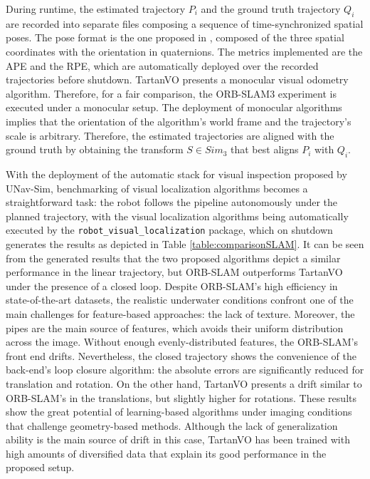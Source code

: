 During runtime, the estimated trajectory $P_i$ and the ground truth trajectory $Q_i$ are recorded into separate files composing a sequence of time-synchronized spatial poses. The pose format is the one proposed in \cite{vSLAM:sturm2012tumrgbd}, composed of the three spatial coordinates with the orientation in quaternions.
The metrics implemented are the \ac{APE} and the \ac{RPE}, which are automatically deployed over the recorded trajectories before shutdown. TartanVO presents a monocular visual odometry algorithm. Therefore, for a fair comparison, the ORB-SLAM3 experiment is executed under a monocular setup. 
The deployment of monocular algorithms implies that the orientation of the algorithm's world frame and the trajectory's scale is arbitrary. Therefore, the estimated trajectories are aligned with the ground truth by obtaining the transform $S \in Sim_3$ that best aligns $P_i$ with $Q_i$.

With the deployment of the automatic stack for visual inspection proposed by UNav-Sim, benchmarking of visual localization algorithms becomes a straightforward task: the robot follows the pipeline autonomously under the planned trajectory, with the visual localization algorithms being automatically executed by the \texttt{robot\_visual\_localization} package, which on shutdown generates the results as depicted in Table \ref{table:comparisonSLAM}. It can be seen from the generated results that the two proposed algorithms depict a similar performance in the linear trajectory, but ORB-SLAM outperforms TartanVO under the presence of a closed loop.
Despite ORB-SLAM's high efficiency in state-of-the-art datasets, the realistic underwater conditions confront one of the main challenges for feature-based approaches: the lack of texture. Moreover, the pipes are the main source of features, which avoids their uniform distribution across the image. Without enough evenly-distributed features, the ORB-SLAM's front end drifts. Nevertheless, the closed trajectory shows the convenience of the back-end's loop closure algorithm: the absolute errors are significantly reduced for translation and rotation.
On the other hand, TartanVO presents a drift similar to ORB-SLAM's in the translations, but slightly higher for rotations. These results show the great potential of learning-based algorithms under imaging conditions that challenge geometry-based methods. Although the lack of generalization ability is the main source of drift in this case, TartanVO has been trained with high amounts of diversified data that explain its good performance in the proposed setup.

